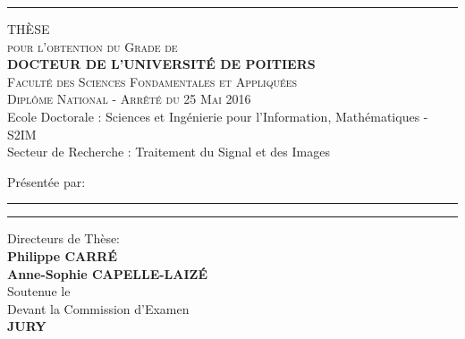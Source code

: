 \pagestyle{empty}
\makeatletter
  \begin{titlepage}
  \begin{myFont}
\thispagestyle{empty}
  \vspace{-2cm}
  \begin{center}
 \rule[0.5ex]{\textwidth}{0.1mm}

\end{center}
  \centering
  \vspace{0.4cm}
  
      {\large \textsc{THÈSE} \vspace{0.2cm}}\\
      \textsc{pour l'obtention du Grade de\\ \vspace{0.2cm}
      \textbf{DOCTEUR DE L'UNIVERSITÉ DE POITIERS}\\
      \vspace{0.3cm}
      Faculté des Sciences Fondamentales et Appliquées\\
Diplôme National - Arrêté du 25 Mai 2016\\
}
 \vspace{0.5cm}
\small
{Ecole Doctorale : Sciences et Ingénierie pour l'Information, Mathématiques - S2IM \\
Secteur de Recherche : Traitement du Signal et des Images\\ \vspace{1cm}}

Présentée par:\\
\large
\textbf{\Author}

    \vspace{0.5cm}
    
\rule{\linewidth}{2pt}

\textbf{\Title}
\rule{\linewidth}{2pt}
      
      {\small  \vspace{0.5cm} Directeurs de Thèse:\\
      
\textbf{Philippe CARR\'E\\Anne-Sophie CAPELLE-LAIZ\'E} \\  \vspace{0.6cm}
Soutenue le \DateSoutenance \\
Devant la Commission d’Examen }
\vspace{0.5cm} \\
\textbf{\large JURY} \\
\vspace{0.4cm}
\small


\end{myFont}
\end{titlepage}
